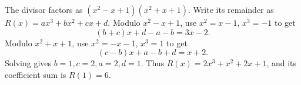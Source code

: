 The divisor factors as $(x^2-x+1)(x^2+x+1)$. Write its remainder as $R(x)=ax^3+bx^2+cx+d$. Modulo $x^2-x+1$, use $x^2=x-1$, $x^3=-1$ to get
\[
(b+c)x+d-a-b=3x-2.
\]
Modulo $x^2+x+1$, use $x^2=-x-1$, $x^3=1$ to get
\[
(c-b)x+a-b+d=x+2.
\]
Solving gives $b=1,c=2,a=2,d=1$. Thus $R(x)=2x^3+x^2+2x+1$, and its coefficient sum is $\boxed{R(1)=6}$.
